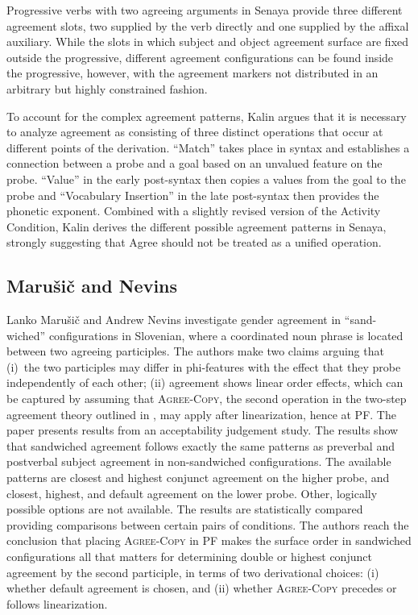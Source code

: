 \documentclass[output=paper
,modfonts
,nonflat]{langsci/langscibook}
\begin{document}
Progressive verbs with two agreeing arguments in Senaya provide three different agreement slots, two supplied by the verb directly and one supplied by the affixal auxiliary. While the slots in which subject and object agreement surface are fixed outside the progressive, different agreement configurations can be found inside the progressive, however, with the agreement markers not distributed in an arbitrary but highly constrained fashion.

To account for the complex agreement patterns, Kalin argues that it is necessary to analyze agreement as consisting of three distinct operations that occur at different points of the derivation. ``Match'' takes place in syntax and establishes a connection between a probe and a goal based on an unvalued feature on the probe. ``Value'' in the early post-syntax then copies a values from the goal to the probe and ``Vocabulary Insertion'' in the late post-syntax then provides the phonetic exponent. Combined with a slightly revised version of the Activity Condition, Kalin derives the different possible agreement patterns in Senaya, strongly suggesting that Agree should not be treated as a unified operation.

\subsection{Maru\v{s}i\v{c} and Nevins}
\label{sec:mandn}

Lanko Marušič and Andrew Nevins investigate gender agreement in ``sand-\linebreak wiched'' configurations in Slovenian, where a coordinated noun phrase is located between two agreeing participles. The authors make two claims arguing that (i)~the two participles may differ in phi-features with the effect that they probe independently of each other; (ii) agreement shows linear order effects, which can be captured by assuming that \textsc{Agree-Copy}, the second operation in the two-step agreement theory outlined in \citet{arreginevins2012}, may apply after linearization, hence at PF. The paper presents results from an acceptability judgement study. The results show that sandwiched agreement follows exactly the same patterns as preverbal and postverbal subject agreement in non-sandwiched configurations. The available patterns are closest and highest conjunct agreement on the higher probe, and closest, highest, and default agreement on the lower probe. Other, logically possible options are not available. The results are statistically compared providing comparisons between certain pairs of conditions. The authors reach the conclusion that placing \textsc{Agree-Copy} in PF makes the surface order in sandwiched configurations all that matters for determining double or highest conjunct agreement by the second participle, in terms of two derivational choices: (i) whether default agreement is chosen, and (ii) whether \textsc{Agree-Copy} precedes or follows linearization.
\end{document}

